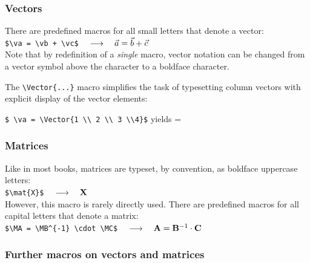 \documentclass{article}
\begin{document}
\subsubsection{Vectors}

There are predefined macros for all small letters that denote a vector:\\
\verb"$\va = \vb + \vc$"               $\quad \longrightarrow \quad  \vec a = \vec b + \vec c$\\
Note that by redefinition of a \emph{single} macro, vector notation
can be changed from a vector symbol above the character
to a boldface character.

The \verb"\Vector{...}" macro simplifies the task of typesetting column vectors
with explicit display of the vector elements:

\verb"$ \va = \Vector{1 \\ 2 \\ 3 \\4}$"  yields
\bdm
 \va =  
\edm


\subsubsection{Matrices}

Like in most books, matrices are typeset, by convention, as boldface uppercase letters:\\
\verb"$\mat{X}$"               $\quad \longrightarrow \quad \mathbf{X}$\\
However, this macro is rarely directly used.
There are predefined macros for all capital letters that denote a matrix:\\
\verb"$\MA = \MB^{-1} \cdot \MC$"               $\quad \longrightarrow \quad  \mathbf{A} = \mathbf{B}^{-1} \cdot \mathbf{C}$ 


\subsubsection{Further macros on vectors and matrices}
\end{document}
